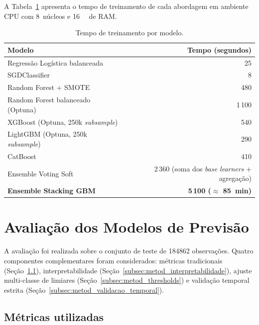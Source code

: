 A Tabela~\ref{tab:metod_tempos} apresenta o tempo de treinamento de cada abordagem em ambiente CPU com 8~núcleos e \SI{16}{\giga\byte} de RAM.

\begin{table}[h]
\centering
\caption{Tempo de treinamento por modelo.}
\label{tab:metod_tempos}
\small
\begin{tabular}{lr}
\toprule
\textbf{Modelo} & \textbf{Tempo (segundos)} \\
\midrule
Regressão Logística balanceada & 25 \\
SGDClassifier                  & 8 \\
Random Forest + SMOTE          & 480 \\
Random Forest balanceado (Optuna) & 1\,100 \\
XGBoost (Optuna, 250k \emph{subsample}) & 540 \\
LightGBM (Optuna, 250k \emph{subsample}) & 290 \\
CatBoost                       & 410 \\
Ensemble Voting Soft           & 2\,360 (soma dos \emph{base learners} + agregação) \\
\textbf{Ensemble Stacking GBM} & \textbf{5\,100 (\(\approx\) 85~min)} \\
\bottomrule
\end{tabular}
\end{table}

\section{Avaliação dos Modelos de Previsão}
\label{sec:metod_avaliacao}

A avaliação foi realizada sobre o conjunto de teste de \num{184862} observações. Quatro componentes complementares foram considerados: métricas tradicionais (Seção~\ref{subsec:metod_metricas}), interpretabilidade (Seção~\ref{subsec:metod_interpretabilidade}), ajuste multi-classe de limiares (Seção~\ref{subsec:metod_thresholds}) e validação temporal estrita (Seção~\ref{subsec:metod_validacao_temporal}).

\subsection{Métricas utilizadas}
\label{subsec:metod_metricas}

